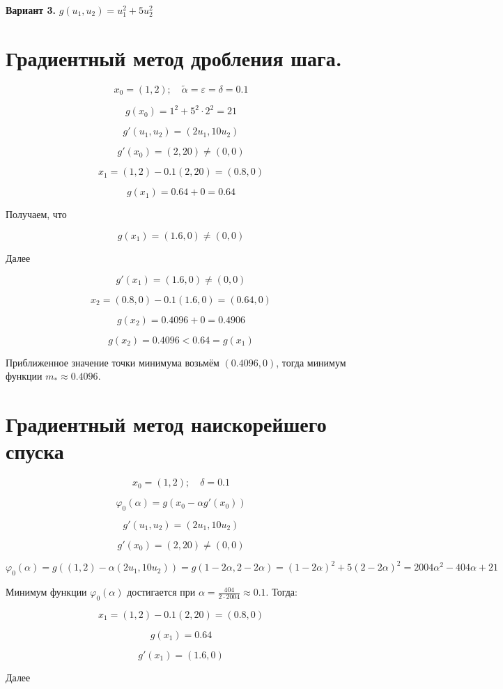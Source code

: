 \documentclass[12 pt]{article}
\begin{document}
\textbf{Вариант 3.} $g(u_1,u_2) = u_1^2+5u_2^2$
\section{Градиентный метод дробления шага.}
$$x_0=(1,2); \quad \tilde{\alpha}=\varepsilon=\delta=0.1$$

$$g(x_0) = 1^2+5^2\cdot2^2=21$$

$$ g'(u_1,u_2) = (2u_1,10u_2) $$

$$ g'(x_0) = (2,20) \neq (0,0) $$	

$$x_1 = (1,2) - 0.1(2,20) = (0.8,0)$$

$$g(x_1) = 0.64+0 = 0.64$$

Получаем, что 

$$g(x_1)=(1.6, 0) \neq (0,0)$$

Далее

$$g'(x_1) = (1.6,0) \neq (0,0)$$

$$x_2 = (0.8,0) - 0.1(1.6,0) = (0.64,0)$$

$$g(x_2) = 0.4096+0 = 0.4906$$

$$g(x_2) = 0.4096 < 0.64 = g(x_1)$$

Приближенное значение точки минимума возьмём $(0.4096,0)$, тогда минимум функции $m_* \approx 0.4096$.

\newpage

\section{Градиентный метод наискорейшего спуска}
	
$$x_0=(1,2); \quad \delta=0.1$$	
	
$$\varphi_0(\alpha) = g(x_0-\alpha g'(x_0))$$

$$ g'(u_1,u_2) = (2u_1,10u_2) $$

$$ g'(x_0) = (2,20) \neq (0,0) $$
	
$$\varphi_0(\alpha) = g((1,2)-\alpha (2u_1,10u_2)) = g(1-2\alpha, 2-2\alpha) = (1-2\alpha)^2 + 5(2-2\alpha)^2 = 2004\alpha^2-404\alpha+21$$

Минимум функции $\varphi_0(\alpha)$ достигается при $\alpha = \frac{404}{2\cdot 2004} \approx 0.1$. Тогда:

$$x_1 = (1,2) - 0.1(2,20) = (0.8,0)$$

$$g(x_1) = 0.64$$

$$g'(x_1)=(1.6,0)$$

Далее
\end{document}
